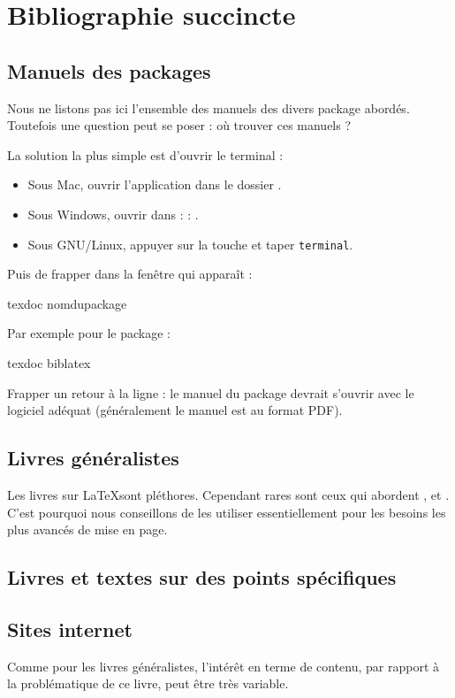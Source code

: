 \chapter{Bibliographie succincte}

\nocite{*}
\section{Manuels des packages \label{manuels}}


Nous ne listons pas ici l'ensemble des manuels des divers package abordés. Toutefois une question peut se poser : où trouver ces manuels ?

La solution la plus simple est d'ouvrir le terminal :
\begin{itemize}
\item Sous Mac, ouvrir l'application  dans le dossier .
\item Sous Windows, ouvrir  dans  :  : .
\item Sous GNU/Linux, appuyer sur la touche  et  taper \verb|terminal|.
\end{itemize}

Puis de frapper dans la fenêtre qui apparaît :

\begin{bashcode}
texdoc nomdupackage
\end{bashcode}

Par exemple pour le package :

\begin{bashcode}
texdoc biblatex
\end{bashcode}

Frapper un retour à la ligne : le manuel du package devrait s'ouvrir avec le logiciel adéquat (généralement le manuel est au format PDF).

\section{Livres généralistes}

Les livres sur \LaTeX sont pléthores. Cependant rares sont ceux qui abordent \XeLaTeX,   et  . C'est pourquoi nous conseillons de les utiliser essentiellement pour les besoins les plus avancés de mise en page.

\printbibliography[keyword=generaliste]

\section{Livres et textes sur des points spécifiques}

\printbibliography[keyword=specifique]


\section{Sites internet}

Comme pour les livres généralistes,  l'intérêt en terme de contenu, par rapport à la problématique de ce livre, peut être très variable. 

\printbibliography[keyword=site]
